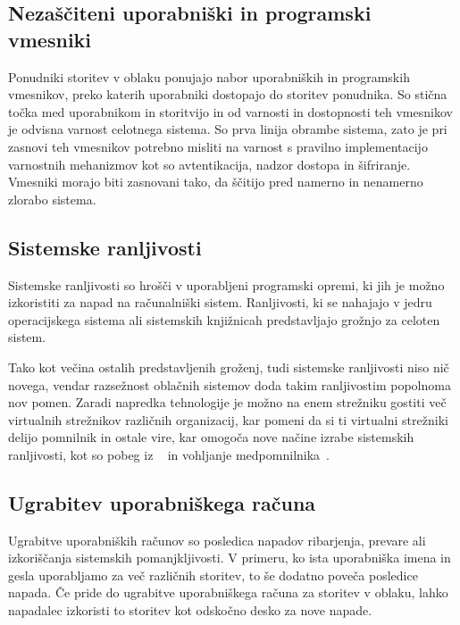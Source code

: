 \documentclass[12pt,a4paper,openany,tikz]{book}
\theoremstyle{plain}
\theoremstyle{definition}
\begin{document}
\subsection{Nezaščiteni uporabniški in programski vmesniki}
\label{sub:Nezaščiteni uporabniški in programski vmesniki}

Ponudniki storitev v oblaku ponujajo nabor uporabniških in programskih vmesnikov, preko katerih uporabniki dostopajo do storitev ponudnika. So stična točka med uporabnikom in storitvijo in od varnosti in dostopnosti teh vmesnikov je odvisna varnost celotnega sistema. So prva linija obrambe sistema, zato je pri zasnovi teh vmesnikov potrebno misliti na varnost s pravilno implementacijo varnostnih mehanizmov kot so avtentikacija, nadzor dostopa in šifriranje. Vmesniki morajo biti zasnovani tako, da ščitijo pred namerno in nenamerno zlorabo sistema.

\subsection{Sistemske ranljivosti}
\label{sub:Sistemske ranljivosti}

Sistemske ranljivosti so hrošči v uporabljeni programski opremi, ki jih je možno izkoristiti za napad na računalniški sistem. Ranljivosti, ki se nahajajo v jedru operacijskega sistema ali sistemskih knjižnicah predstavljajo grožnjo za celoten sistem.

Tako kot večina ostalih predstavljenih groženj, tudi sistemske ranljivosti niso nič novega, vendar razsežnost oblačnih sistemov doda takim ranljivostim popolnoma nov pomen. Zaradi napredka tehnologije je možno na enem strežniku gostiti več virtualnih strežnikov različnih organizacij, kar pomeni da si ti virtualni strežniki delijo pomnilnik in ostale vire, kar omogoča nove načine izrabe sistemskih ranljivosti, kot so pobeg iz ~\cite{schwartz2012new} in vohljanje medpomnilnika~\cite{zhang2012cross}.

\subsection{Ugrabitev uporabniškega računa}
\label{sub:Ugrabitev uporabniškega računa}

Ugrabitve uporabniških računov so posledica napadov ribarjenja, prevare ali izkoriščanja sistemskih pomanjkljivosti. V primeru, ko ista uporabniška imena in gesla uporabljamo za več različnih storitev, to še dodatno poveča posledice napada. Če pride do ugrabitve uporabniškega računa za storitev v oblaku, lahko napadalec izkoristi to storitev kot odskočno desko za nove napade.
\end{document}
